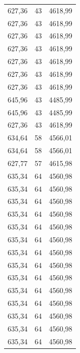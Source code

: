 \begin{center}
\begin{longtable}{|l|l|l|}
627,36            & 43               & 4618,99        \\
627,36            & 43               & 4618,99        \\
627,36            & 43               & 4618,99        \\
627,36            & 43               & 4618,99        \\
627,36            & 43               & 4618,99        \\
627,36            & 43               & 4618,99        \\
627,36            & 43               & 4618,99        \\
645,96            & 43               & 4485,99        \\
645,96            & 43               & 4485,99        \\
627,36            & 43               & 4618,99        \\
634,64            & 58               & 4566,01        \\
634,64            & 58               & 4566,01        \\
627,77            & 57               & 4615,98        \\
635,34            & 64               & 4560,98        \\
635,34            & 64               & 4560,98        \\
635,34            & 64               & 4560,98        \\
635,34            & 64               & 4560,98        \\
635,34            & 64               & 4560,98        \\
635,34            & 64               & 4560,98        \\
635,34            & 64               & 4560,98        \\
635,34            & 64               & 4560,98        \\
635,34            & 64               & 4560,98        \\
635,34            & 64               & 4560,98        \\
635,34            & 64               & 4560,98        \\
635,34            & 64               & 4560,98        \\
635,34            & 64               & 4560,98        \\
635,34            & 64               & 4560,98        \\

\end{longtable}
\end{center}
